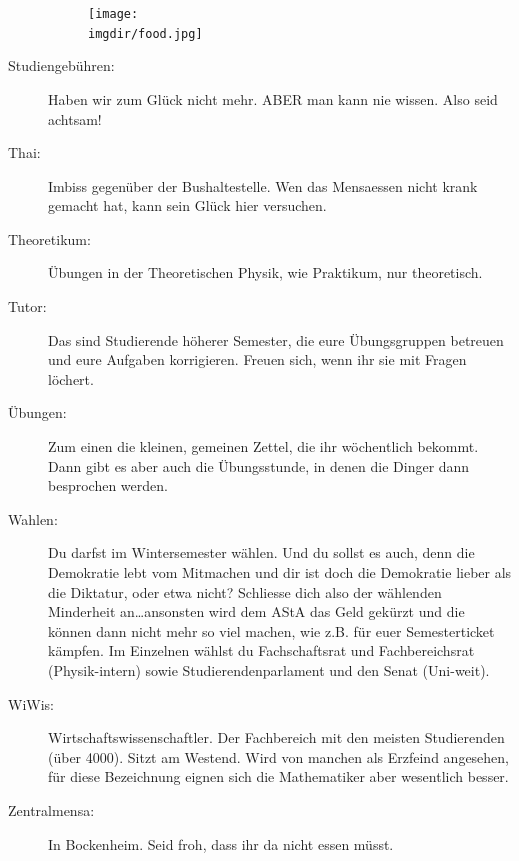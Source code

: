 \begin{description}
\begin{figure}
	\centering
    \texttt{[image: \\imgdir/food.jpg]}
\end{figure}

\item[Studiengebühren:] Haben wir zum Gl\"uck nicht mehr.
ABER man kann nie wissen.
Also seid achtsam!

\item[Thai:] Imbiss gegen\"uber der Bushaltestelle.
Wen das Mensaessen nicht krank gemacht hat, kann sein Gl\"uck hier versuchen.

 \item[Theoretikum:] Übungen in der Theoretischen Physik, wie Praktikum, nur
theoretisch.

    \item[Tutor:] Das sind Studierende höherer Semester, die eure
Übungsgruppen betreuen und eure Aufgaben korrigieren.
Freuen sich, wenn ihr sie mit Fragen löchert.

    \item[Übungen:] Zum einen die kleinen, gemeinen Zettel, die ihr wöchentlich bekommt.
Dann gibt es aber auch die Übungsstunde, in denen die Dinger dann besprochen werden.


    \item[Wahlen:] Du darfst im Wintersemester wählen.
    Und du sollst es auch, denn die
Demokratie lebt vom Mitmachen und dir ist doch die Demokratie
lieber als die Diktatur, oder etwa nicht? Schliesse dich also der
wählenden Minderheit an\ldots ansonsten wird dem AStA das Geld
gekürzt und die können dann nicht mehr so viel machen, wie z.B.
für euer Semesterticket kämpfen.
Im Einzelnen wählst du
Fachschaftsrat und Fachbereichsrat (Physik-intern) sowie
Studierendenparlament und den Senat (Uni-weit).

    \item[WiWis:] Wirtschaftswissenschaftler.
    Der Fachbereich mit den meisten Studierenden (über 4000).
 Sitzt am Westend.
 Wird von manchen als Erzfeind angesehen, für diese
Bezeichnung eignen sich die Mathematiker aber wesentlich besser.

\item[Zentralmensa:] In Bockenheim.
Seid froh, dass ihr da nicht essen müsst.


\end{description}
%
